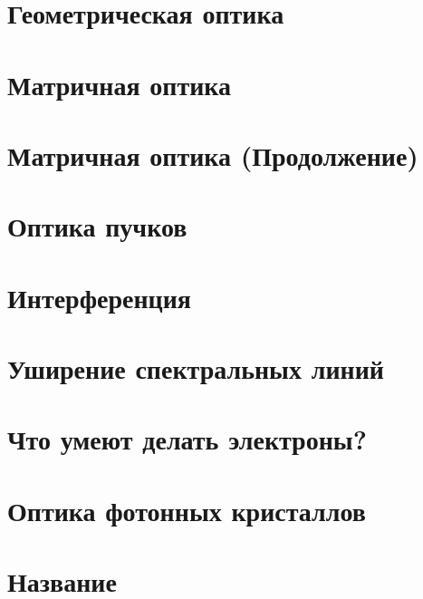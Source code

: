 


\section{Геометрическая оптика}

\newpage 

\section{Матричная оптика}


\section{Матричная оптика (Продолжение)}


\section{Оптика пучков}


\section{Интерференция}


\section{Уширение спектральных линий}


\section{Что умеют делать электроны?}


% 

\section{Оптика фотонных кристаллов}



\section{Название}





